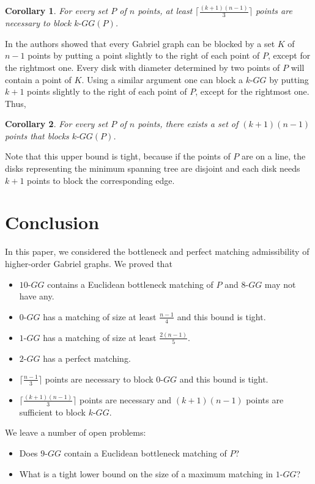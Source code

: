 \documentclass[11pt,a4paper]{article}
\newcommand{\kGG}[2]{$#1\text{-}GG#2$}
\newtheorem{corollary}{Corollary}
\begin{document}
\begin{corollary}
For every set $P$ of $n$ points, at least $\lceil\frac{(k+1)(n-1)}{3}\rceil$ points are necessary to block \kGG{k}{(P)}.
\end{corollary}

In \cite{Aronov2013} the authors showed that every Gabriel graph can be blocked by a set $K$ of $n-1$ points by putting a point slightly to the right of each point of $P$, except for the rightmost one. Every disk with diameter determined by two points of $P$ will contain a point of $K$. Using a similar argument one can block a \kGG{k}{} by putting $k+1$ points slightly to the right of each point of $P$, except for the rightmost one. Thus,

\begin{corollary}
 For every set $P$ of $n$ points, there exists a set of $(k+1)(n-1)$ points that blocks \kGG{k}{(P)}.
\end{corollary}

Note that this upper bound is tight, because if the points of $P$ are on a line, the disks representing the minimum spanning tree are disjoint and each disk needs $k+1$ points to block the corresponding edge.

\section{Conclusion}
\label{conclusion}
In this paper, we considered the bottleneck and perfect matching admissibility of higher-order Gabriel graphs. We proved that
\begin{itemize}
  \item \kGG{10}{} contains a Euclidean bottleneck matching of $P$ and \kGG{8}{} may not have any.
  \item \kGG{0}{} has a matching of size at least $\frac{n-1}{4}$ and this bound is tight.
  \item \kGG{1}{} has a matching of size at least $\frac{2(n-1)}{5}$.
  \item \kGG{2}{} has a perfect matching.
    \item $\lceil\frac{n-1}{3}\rceil$ points are necessary to block \kGG{0}{} and this bound is tight.
  \item $\lceil\frac{(k+1)(n-1)}{3}\rceil$ points are necessary and $(k+1)(n-1)$ points are sufficient to block \kGG{k}{}.
\end{itemize}
We leave a number of open problems:
\begin{itemize}
  \item Does \kGG{9}{} contain a Euclidean bottleneck matching of $P$?
  \item What is a tight lower bound on the size of a maximum matching in \kGG{1}{}?
\end{itemize}



\end{document}
